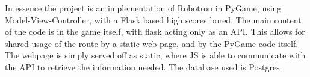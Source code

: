 In essence the project is an implementation of Robotron in PyGame, using Model-View-Controller, with a Flask based high scores bored. The main content of the code is in the game itself, with flask acting only as an API. This allows for shared usage of the route by a static web page, and by the PyGame code itself. The webpage is simply served off as static, where JS is able to communicate with the API to retrieve the information needed. The database used is Postgres. 